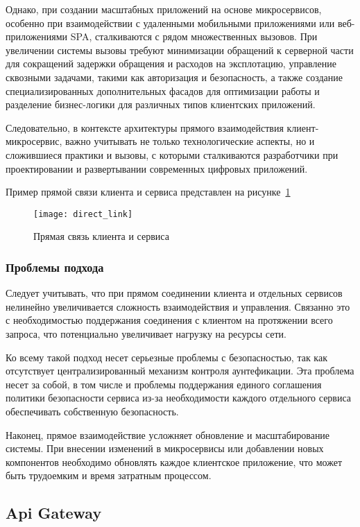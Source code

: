 Однако, при создании масштабных приложений на основе микросервисов, особенно при взаимодействии с
удаленными мобильными приложениями или веб-приложениями SPA, сталкиваются с
рядом множественных вызовов.
При увеличении системы
вызовы требуют минимизации обращений к серверной части для сокращений задержки обращения и расходов
на эксплотацию,
управление сквозными задачами, такими как авторизация и безопасность, а также создание
специализированных дополнительных фасадов для оптимизации работы и разделение бизнес-логики для
различных типов клиентских приложений.

Следовательно, в контексте архитектуры прямого взаимодействия клиент-микросервис, важно учитывать не
только технологические аспекты, но и сложившиеся практики и вызовы, с которыми сталкиваются
разработчики при проектировании и развертывании современных цифровых приложений.

Пример прямой связи клиента и сервиса представлен на рисунке~\ref{fig:direct_link}

\begin{figure}[htbp]
    \centering
    \texttt{[image: direct\_link]}
    \caption{Прямая связь клиента и сервиса}
    \label{fig:direct_link}
\end{figure}

\subsubsection{Проблемы подхода}

Следует учитывать, что при прямом соединении клиента и отдельных сервисов нелинейно увеличивается
сложность взаимодействия и управления.
Связанно это с необходимостью поддержания соединения с
клиентом на протяжении всего запроса, что потенциально увеличивает нагрузку на ресурсы сети.

Ко всему такой подход несет серьезные проблемы с безопасностью, так как отсутствует
централизированный
механизм контроля аунтефикации.
Эта проблема несет за собой, в том числе и проблемы поддержания
единого соглашения политики безопасности сервиса из-за необходимости каждого отдельного сервиса
обеспечивать собственную безопасность.

Наконец, прямое взаимодействие усложняет обновление и масштабирование системы.
При внесении
изменений в микросервисы или добавлении новых компонентов необходимо обновлять каждое клиентское
приложение, что может быть трудоемким и время затратным процессом.

\subsection{Api Gateway}

